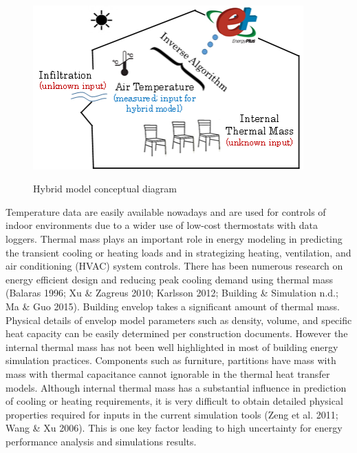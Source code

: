 \begin{figure}[h]
\begin{center}
\includegraphics[width=295pt]{media/img_HybridModel-1.png}
\caption{Hybrid model conceptual diagram}\protect \label{fig:hybrid-model-conceptual-diagram}
\end{center}
\end{figure}

Temperature data are easily available nowadays and are used for controls of indoor environments due to a wider use of low-cost thermostats with data loggers. Thermal mass plays an important role in energy modeling in predicting the transient cooling or heating loads and in strategizing heating, ventilation, and air conditioning (HVAC) system controls. There has been numerous research on energy efficient design and reducing peak cooling demand using thermal mass  (Balaras 1996; Xu \& Zagreus 2010; Karlsson 2012; Building \& Simulation n.d.; Ma \& Guo 2015). Building envelop takes a significant amount of thermal mass. Physical details of envelop model parameters such as density, volume, and specific heat capacity can be easily determined per construction documents. However the internal thermal mass has not been well highlighted in most of building energy simulation practices. Components such as furniture, partitions have mass with mass with thermal capacitance cannot ignorable in the thermal heat transfer models. Although internal thermal mass has a substantial influence in prediction of cooling or heating requirements, it is very difficult to obtain detailed physical properties required for inputs in the current simulation tools (Zeng et al. 2011; Wang \& Xu 2006). This is one key factor leading to high uncertainty for energy performance analysis and simulations results.

